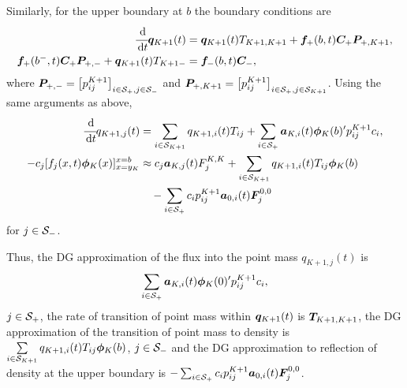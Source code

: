 Similarly, for the upper boundary at \(b\) the boundary conditions are 
\begin{align*}
\cfrac{\, \mathrm{d}}{\, \mathrm{d} t}\boldsymbol q_{K+1}(t) &= \boldsymbol q_{K+1}(t) T_{{K+1}, {K+1}} + \boldsymbol f_+(b,t)\boldsymbol C_+\boldsymbol P_{+,{K+1}},\\
\boldsymbol f_+(b^-,t)\boldsymbol C_+\boldsymbol P_{+,-} + \boldsymbol q_{K+1}(t)T_{{K+1}-}&=\boldsymbol f_-(b,t)\boldsymbol C_-,
\end{align*}
where \(\boldsymbol P_{+,-} = \left[p_{ij}^{K+1}\right]_{i\in\mathcal{S}_+,j\in\mathcal{S}_{-}}\) and \(\boldsymbol P_{+,K+1} = \left[p_{ij}^{K+1}\right]_{i\in\mathcal{S}_+,j\in\mathcal{S}_{K+1}}\). Using the same arguments as above, 
\begin{align*}
\cfrac{\, \mathrm{d}}{\, \mathrm{d} t} q_{{K+1},j}(t) &= \sum_{i\in\mathcal{S}_{K+1}}q_{{K+1},i}(t) T_{ij} + \sum_{i\in\mathcal{S}_+}\boldsymbol a_{K,i}(t)\boldsymbol \phi_K(b)'{}p_{ij}^{K+1} c_i,
\\-c_j[f_j(x,t)\boldsymbol\phi_K(x)]_{x=y_K}^{x=b} & \approx c_j\boldsymbol a_{K,j}(t)F_j^{K,K}+\sum_{i\in\mathcal{S}_{K+1}}q_{{K+1},i}(t)T_{ij}\boldsymbol\phi_K(b) 
\\&\quad{} - \sum_{i\in\mathcal{S}_+}c_ip_{ij}^{K+1}\boldsymbol a_{0,i}(t)\boldsymbol F_j^{0,0}
\end{align*}
for \(j\in\mathcal{S}_-\). 

Thus, the DG approximation of the flux into the point mass \(q_{{K+1},j}(t)\) is 
\[\sum_{i\in\mathcal{S}_+}\boldsymbol a_{K,i}(t)\boldsymbol \phi_K(0)'{} p_{ij}^{K+1} c_i,\]
\(j\in\mathcal{S}_+\), the rate of transition of point mass within \(\boldsymbol q_{{K+1}}(t)\) is \(\boldsymbol T_{{K+1},{K+1}}\), the DG approximation of the transition of point mass to density is \(\sum\limits_{i\in\mathcal{S}_{K+1}}q_{{K+1},i}(t)T_{ij}\boldsymbol\phi_K(b)\), \(j\in\mathcal{S}_-\) and the DG approximation to reflection of density at the upper boundary is \(- \sum_{i\in\mathcal{S}_+}c_ip_{ij}^{K+1}\boldsymbol a_{0,i}(t)\boldsymbol F_j^{0,0}\). 

